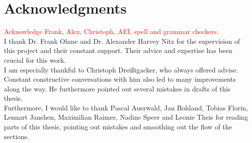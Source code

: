 \section{Acknowledgments}
\textcolor{red}{Acknowledge Frank, Alex, Christoph, AEI, spell and grammar checkers.}\\
I thank Dr. Frank Ohme and Dr. Alexander Harvey Nitz for the supervision of this project and their constant support. Their advice and expertise has been crucial for this work.\\
I am especially thankful to Christoph Dreißigacker, who always offered advise. Constant constructive conversations with him also led to many improvements along the way. He furthermore pointed out several mistakes in drafts of this thesis.\\
Furthermore, I would like to thank Pascal Auerwald, Jan Bohland, Tobias Florin, Lennart Janshen, Maximilian Raimer, Nadine Speer and Leonie Theis for reading parts of this thesis, pointing out mistakes and smoothing out the flow of the sections.